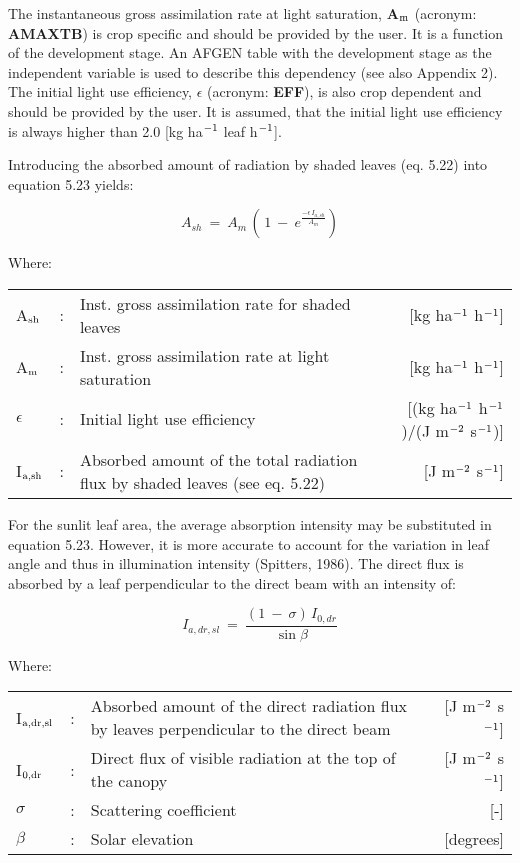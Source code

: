 The instantaneous gross assimilation rate at light saturation, {\bf A$_{{\rm m}}$} (acronym: {\bf AMAXTB}) is
crop specific and should be provided by the user. It is a function of the development
stage. An AFGEN table with the development stage as the independent variable is used to
describe this dependency (see also Appendix 2). The initial light use efficiency, {\bf $\epsilon$}
(acronym: {\bf EFF}), is also crop dependent and should be provided by the user. It is
assumed, that the initial light use efficiency is always higher than 2.0 [kg ha$^{{\rm -1}}$ leaf h$^{{\rm -1}}$]. 

Introducing the absorbed amount of radiation by shaded leaves (eq. 5.22) into equation 5.23 yields:

\begin{equation}
A _{sh} ~=~ A _{m} \, (\, 1~-~ e ^{{\frac{ - \epsilon\, I _{a,sh} }{ A _{m} }} } )
\end{equation}

Where:\\
\begin{tabularx}{\textwidth}{llXr}
A$_{{\rm sh}}$ &:& Inst. gross assimilation rate for shaded leaves  & 
    [kg ha$^{{\rm -1}}$ h$^{{\rm -1}}$]\\
A$_{{\rm m}}$ &:& Inst. gross assimilation rate at light saturation & 
    [kg ha$^{{\rm -1}}$ h$^{{\rm -1}}$]\\
$\epsilon$ &:& Initial light use efficiency  &  
    [(kg ha$^{{\rm -1}}$ h$^{{\rm -1}}$)/(J m$^{{\rm -2}}$ s$^{{\rm -1}}$)]\\
I$_{{\rm a,sh}}$ &:& Absorbed amount of the total radiation flux  by shaded leaves (see eq. 5.22)   &
     [J m$^{{\rm -2}}$ s$^{{\rm -1}}$]\\
\end{tabularx}

For the sunlit leaf area, the average absorption intensity may be substituted in equation
5.23. However, it is more accurate to account for the variation in leaf angle and thus in
illumination intensity (Spitters, 1986). The direct flux is absorbed by a leaf perpendicular
to the direct beam with an intensity of: 

\begin{equation}
I _{a,dr,sl} ~=~{\frac{(1~-~ \sigma )\, I _{0,dr} }{\sin \beta }}
\end{equation}

Where:\\
\begin{tabularx}{\textwidth}{llXr}
I$_{{\rm a,dr,sl}}$ &:& Absorbed amount of the direct radiation flux by leaves
   perpendicular to the direct beam    &    [J m$^{{\rm -2}}$ s$^{{\rm -1}}$]\\
I$_{{\rm 0,dr}}$ &:& Direct flux of visible radiation at the top of 
   the canopy &  [J m$^{{\rm -2}}$ s$^{{\rm -1}}$]\\
$\sigma$ &:& Scattering coefficient  &[-]\\
$\beta$ &:& Solar elevation   & [degrees]\\
\end{tabularx}

